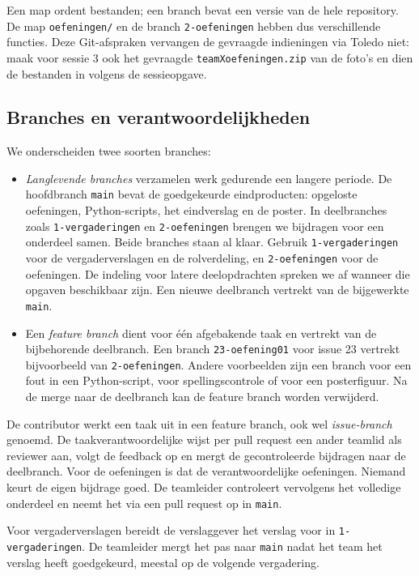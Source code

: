 \documentclass[kulak]{kulakarticle} %
\begin{document}
Een map ordent bestanden; een branch bevat een versie van de hele
repository. De map \texttt{oefeningen/} en de branch
\texttt{2-oefeningen} hebben dus verschillende functies.
Deze Git-afspraken vervangen de gevraagde indieningen via Toledo niet:
maak voor sessie 3 ook het gevraagde \texttt{teamXoefeningen.zip} van de
foto's en dien de bestanden in volgens de sessieopgave.

\subsection{Branches en verantwoordelijkheden}

We onderscheiden twee soorten branches:
\begin{itemize}
    \item \emph{Langlevende branches} verzamelen werk gedurende een langere
    periode. De hoofdbranch \texttt{main} bevat de goedgekeurde eindproducten:
    opgeloste oefeningen, Python-scripts, het eindverslag en de poster.
    In deelbranches zoals \texttt{1-vergaderingen} en \texttt{2-oefeningen}
    brengen we bijdragen voor een onderdeel samen. Beide branches staan
    al klaar. Gebruik \texttt{1-vergaderingen} voor de vergaderverslagen
    en de rolverdeling, en \texttt{2-oefeningen} voor de oefeningen.
    De indeling voor latere deelopdrachten spreken we af wanneer die
    opgaven beschikbaar zijn. Een nieuwe deelbranch vertrekt van
    de bijgewerkte \texttt{main}.
    \item Een \emph{feature branch} dient voor één afgebakende taak en
    vertrekt van de bijbehorende deelbranch. Een branch
    \texttt{23-oefening01} voor issue 23 vertrekt bijvoorbeeld van
    \texttt{2-oefeningen}. Andere voorbeelden zijn een branch voor een fout
    in een Python-script, voor spellingscontrole of voor een posterfiguur.
    Na de merge naar de deelbranch kan de feature branch worden verwijderd.
\end{itemize}

De contributor werkt een taak uit in een feature branch, ook wel
\emph{issue-branch} genoemd. De taakverantwoordelijke wijst per pull request
een ander teamlid als reviewer aan, volgt de feedback op en mergt de
gecontroleerde bijdragen naar de deelbranch. Voor de oefeningen is dat de
verantwoordelijke oefeningen. Niemand keurt de eigen bijdrage goed.
De teamleider controleert vervolgens het volledige onderdeel en neemt het
via een pull request op in \texttt{main}.

Voor vergaderverslagen bereidt de verslaggever het verslag voor in
\texttt{1-vergaderingen}. De teamleider mergt het pas naar \texttt{main}
nadat het team het verslag heeft goedgekeurd, meestal op de volgende vergadering.
\end{document}
